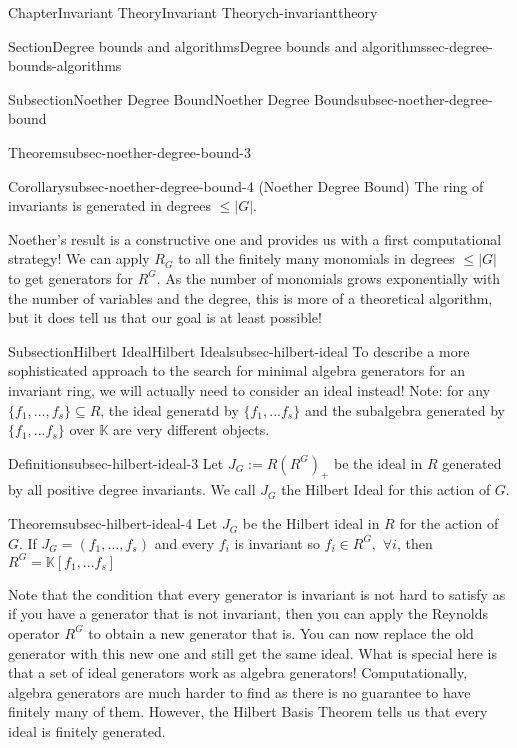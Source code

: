 \documentclass[oneside,10pt,]{book}
\begin{document}
\begin{chapterptx}{Chapter}{Invariant Theory}{}{Invariant Theory}{}{}{ch-invarianttheory}
\begin{sectionptx}{Section}{Degree bounds and algorithms}{}{Degree bounds and algorithms}{}{}{sec-degree-bounds-algorithms}
\begin{subsectionptx}{Subsection}{Noether Degree Bound}{}{Noether Degree Bound}{}{}{subsec-noether-degree-bound}
\begin{theorem}{Theorem}{}{}{subsec-noether-degree-bound-3}
\begin{equation*}
\end{equation*}
%
\end{theorem}
\begin{corollary}{Corollary}{}{}{subsec-noether-degree-bound-4}%
(Noether Degree Bound) The ring of invariants is generated in degrees \(\leq |G|\).%
\end{corollary}
Noether's result is a constructive one and provides us with a first computational strategy! We can apply \(R_G\) to all the finitely many monomials in degrees \(\leq |G|\) to get generators for \(R^G\). As the number of monomials grows exponentially with the number of variables and the degree, this is more of a theoretical algorithm, but it does tell us that our goal is at least possible!%
\end{subsectionptx}
%
%
\typeout{************************************************}
\typeout{************************************************}
%
\begin{subsectionptx}{Subsection}{Hilbert Ideal}{}{Hilbert Ideal}{}{}{subsec-hilbert-ideal}
To describe a more sophisticated approach to the search for minimal algebra generators for an invariant ring, we will actually need to consider an ideal instead! Note: for  any \(\{ f_1,..., f_s\} \subseteq R\), the ideal generatd by \(\{f_1,...f_s\}\) and the subalgebra generated by  \(\{f_1,...f_s\}\) over \(\mathbb{K}\) are very different objects.%
\begin{definition}{Definition}{}{subsec-hilbert-ideal-3}%
Let \(J_G := R(R^G)_+\) be the ideal in \(R\) generated by all positive degree invariants. We call \(J_G\) the Hilbert Ideal for this action of \(G\).%
\end{definition}
\begin{theorem}{Theorem}{}{}{subsec-hilbert-ideal-4}%
Let \(J_G \) be the Hilbert ideal in \(R\) for the action of \(G\). If \(J_G = (f_1,...,f_s)\) and every \(f_i\) is invariant so \(f_i\in R^G, \,\, \forall i\), then \(R^G = \mathbb{K}[f_1,...f_s]\)%
\end{theorem}
Note that the condition that every generator is invariant is not hard to satisfy as if you have a generator that is not invariant, then you can apply the Reynolds operator \(R^G\) to obtain a new generator that is. You can now replace the old generator with this new one and still get the same ideal. What is special here is that a set of ideal generators work as algebra generators! Computationally, algebra generators are much harder to find as there is no guarantee to have finitely many of them. However, the Hilbert Basis Theorem tells us that every ideal is finitely generated.%

\end{subsectionptx}
\end{sectionptx}
\end{chapterptx}
\end{document}
